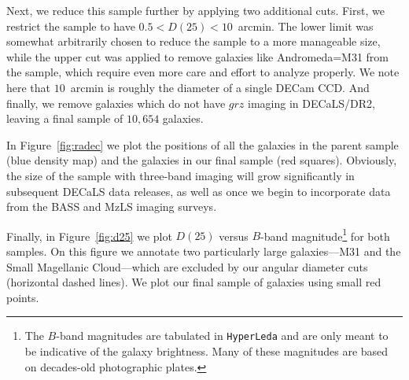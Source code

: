 Next, we reduce this sample further by applying two additional cuts.  First, we
restrict the sample to have $0.5<D(25)<10$~arcmin.  The lower limit was somewhat
arbitrarily chosen to reduce the sample to a more manageable size, while the
upper cut was applied to remove galaxies like Andromeda=M31 from the sample,
which require even more care and effort to analyze properly.  We note here that
$10$~arcmin is roughly the diameter of a single DECam CCD.  And finally, we
remove galaxies which do not have $grz$ imaging in DECaLS/DR2, leaving a final
sample of $10,654$ galaxies.

In Figure~\ref{fig:radec} we plot the positions of all the galaxies in the
parent sample (blue density map) and the galaxies in our final sample (red
squares).  Obviously, the size of the sample with three-band imaging will grow
significantly in subsequent DECaLS data releases, as well as once we begin to
incorporate data from the BASS and MzLS imaging surveys.


Finally, in Figure~\ref{fig:d25} we plot $D(25)$ versus $B$-band
magnitude\footnote{The $B$-band magnitudes are tabulated in {\tt HyperLeda} and
  are only meant to be indicative of the galaxy brightness.  Many of these
  magnitudes are based on decades-old photographic plates.} for both samples.
On this figure we annotate two particularly large galaxies---M31 and the Small
Magellanic Cloud---which are excluded by our angular diameter cuts (horizontal
dashed lines).  We plot our final sample of galaxies using small red points.


